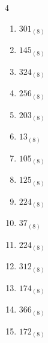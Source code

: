 \begin{multicols}{4}
\begin{enumerate}
\resetques

  \item $301_{(8)}$

        \phantom{$=193$}

  \item $145_{(8)}$

        \phantom{$=101$}

  \item $324_{(8)}$

        \phantom{$=212$}

  \item $256_{(8)}$

        \phantom{$=174$}

  \item $203_{(8)}$

        \phantom{$=131$}

  \item $13_{(8)}$

        \phantom{$=11$}

  \item $105_{(8)}$

        \phantom{$=69$}

  \item $125_{(8)}$

        \phantom{$=85$}

  \item $224_{(8)}$

        \phantom{$=148$}

  \item $37_{(8)}$

        \phantom{$=31$}

  \item $224_{(8)}$

        \phantom{$=148$}

  \item $312_{(8)}$

        \phantom{$=202$}

  \item $174_{(8)}$

        \phantom{$=124$}

  \item $366_{(8)}$

        \phantom{$=246$}

  \item $172_{(8)}$

        \phantom{$=122$}

\columnbreak %


\end{enumerate}
\end{multicols}
